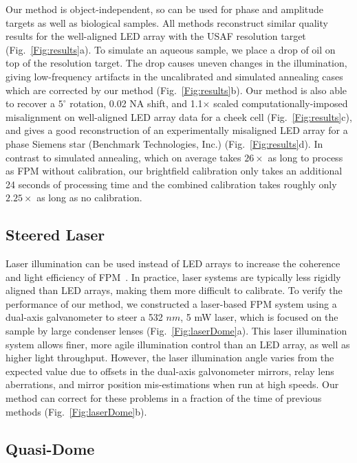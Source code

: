 Our method is object-independent, so can be used for phase and amplitude targets as well as biological samples. All methods reconstruct similar quality results for the well-aligned LED array with the USAF resolution target (Fig.~\ref{Fig:results}a). To simulate an aqueous sample, we place a drop of oil on top of the resolution target. The drop causes uneven changes in the illumination, giving low-frequency artifacts in the uncalibrated and simulated annealing cases which are corrected by our method (Fig.~\ref{Fig:results}b). Our method is also able to recover a $5^{\circ}$ rotation, 0.02 NA shift, and 1.1$\times$ scaled computationally-imposed misalignment on well-aligned LED array data for a cheek cell (Fig.~\ref{Fig:results}c), and gives a good reconstruction of an experimentally misaligned LED array for a phase Siemens star (Benchmark Technologies, Inc.) (Fig.~\ref{Fig:results}d). In contrast to simulated annealing, which on average takes $26 \times$ as long to process as FPM without calibration, our brightfield calibration only takes an additional 24 seconds of processing time and the combined calibration takes roughly only $2.25 \times$ as long as no calibration.

\subsection{Steered Laser}
Laser illumination can be used instead of LED arrays to increase the coherence and light efficiency of FPM~\cite{Kuang:15,Chung2016}. In practice, laser systems are typically less rigidly aligned than LED arrays, making them more difficult to calibrate. To verify the performance of our method, we constructed a laser-based FPM system using a dual-axis galvanometer to steer a 532 $nm$, 5 mW laser, which is focused on the sample by large condenser lenses (Fig.~\ref{Fig:laserDome}a). This laser illumination system allows finer, more agile illumination control than an LED array, as well as higher light throughput. However, the laser illumination angle varies from the expected value due to offsets in the dual-axis galvonometer mirrors, relay lens aberrations, and mirror position mis-estimations when run at high speeds. Our method can correct for these problems in a fraction of the time of previous methods (Fig.~\ref{Fig:laserDome}b).

\subsection{Quasi-Dome}

